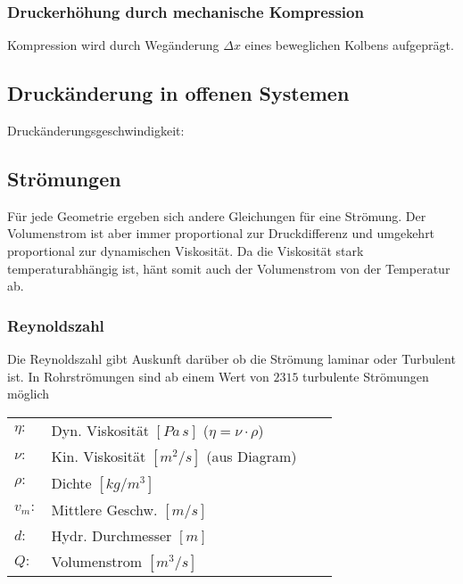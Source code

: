 \subsubsection{Druckerhöhung durch mechanische Kompression}
Kompression wird durch Wegänderung $\Delta x$ eines beweglichen Kolbens aufgeprägt.








\subsection{Druckänderung in offenen Systemen}
Druckänderungsgeschwindigkeit:



\vfill
\columnbreak
\subsection{Strömungen}
Für jede Geometrie ergeben sich andere Gleichungen für eine Strömung. Der Volumenstrom ist aber immer proportional zur Druckdifferenz und umgekehrt proportional zur dynamischen Viskosität. Da die Viskosität stark temperaturabhängig ist, hänt somit auch der Volumenstrom von der Temperatur ab. 

\subsubsection{Reynoldszahl}
Die Reynoldszahl gibt Auskunft darüber ob die Strömung laminar oder Turbulent ist. In Rohrströmungen sind ab einem Wert von $2315$ turbulente Strömungen möglich
\begin{tabular}{llll}
$\eta:$ & Dyn. Viskosität $[Pa \, s]$ \qquad ($\eta = \nu \cdot \rho$)\\
$\nu:$ & Kin. Viskosität $[m^2/s]$ \qquad (aus Diagram) \\
$\rho:$ & Dichte $[kg/m^3]$  \\
$v_m:$ & Mittlere Geschw. $[m/s]$ \\
$d:$ & Hydr. Durchmesser $[m]$ \\
$Q:$ & Volumenstrom $[m^3/s]$
\end{tabular} \\


